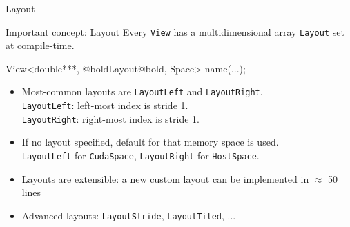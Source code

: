 \begin{frame}[fragile]{Layout}

  \begin{block}{Important concept: Layout}
    Every \texttt{View} has a multidimensional array \texttt{Layout} set at compile-time.
  \end{block}

  \vspace{5pt}

  \begin{code}[frame=single, keywords={}]
View<double***, @boldLayout@bold, Space> name(...);
  \end{code}

  \pause
  \vspace{-5pt}

  \begin{itemize}
    \item{Most-common layouts are \texttt{LayoutLeft} and \texttt{LayoutRight}. \\
      \hspace{10pt} \texttt{LayoutLeft}: left-most index is stride 1.\\
      \hspace{10pt} \texttt{LayoutRight}: right-most index is stride 1.}
    \item{If no layout specified, default for that memory space is used. \\
      \hspace{10pt} \texttt{LayoutLeft} for \texttt{CudaSpace}, \texttt{LayoutRight} for \texttt{HostSpace}.}
    \item{Layouts are extensible: a new custom layout can be implemented in $\approx$ 50 lines}
    \item{Advanced layouts: \texttt{LayoutStride}, \texttt{LayoutTiled}, ...}
  \end{itemize}

  \vspace{-15pt}

\end{frame}


